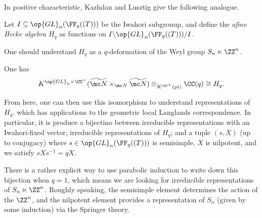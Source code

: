 \documentclass{article}
\begin{document}
In positive characteristic, Kazhdan and Lusztig give the following analogue.
\begin{definition}
	Let $I\subseteq\op{GL}_n(\FF_q((T)))$ be the Iwahori subgrouup, and define the \textit{afine Hecke algebra $H_q$} as functions on $I\backslash\op{GL}_n(\FF_q((T)))/I$.
\end{definition}
\begin{remark}
	One should understand $H_q$ as a $q$-deformation of the Weyl group $S_n\ltimes\ZZ^n$.
\end{remark}
\begin{theorem}
	One has
	\[K^{{\op{GL}_n}\times\CC^\times}(\widetilde{\mc N}\times_{\mc N}\widetilde{\mc N})\otimes_{K^{\CC^\times}(\mathrm{pt})}\CC(q)\cong H_q.\]
\end{theorem}
From here, one can then use this isomorphism to understand representations of $H_q$, which has applications to the geometric local Langlands correspondence. In particular, it is produce a bijectino between irreducible representations with an Iwahori-fixed vector; irreducible representations of $H_q$; and a tuple $(s,X)$ (up to conjugacy) where $s\in\op{GL}_n(\FF_q((T)))$ is semisimple, $X$ is nilpotent, and we satisfy $sXs^{-1}=qX$.
\begin{remark}
	There is a rather explicit way to use parabolic induction to write down this bijection when $q=1$, which means we are looking for irreducible representations of $S_n\ltimes\ZZ^n$. Roughly speaking, the semisimple element determines the action of the $\ZZ^n$, and the nilpotent element provides a representation of $S_n$ (given by some induction) via the Springer theory.
\end{remark}
\end{document}
